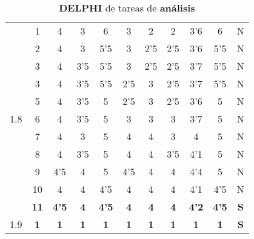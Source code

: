 \documentclass[11pt,a4paper,spanish,twoside]{report}
\begin{document}
\begin{table}[!h]
\begin{tabular}{|c|c||c|c|c|c|c||c|c|c||c|}
    \multirow{11}{*}{1.8} 
    & 1  & 4   & 3   & 6   & 3   & 2   & 2   & 3'6 & 6   & N \\
    & 2  & 4   & 3   & 5'5 & 3   & 2'5 & 2'5 & 3'6 & 5'5 & N \\
    & 3  & 4   & 3'5 & 5'5 & 3   & 2'5 & 2'5 & 3'7 & 5'5 & N \\
    & 3  & 4   & 3'5 & 5'5 & 2'5 & 3   & 2'5 & 3'7 & 5'5 & N \\
    & 5  & 4   & 3'5 & 5   & 2'5 & 3   & 2'5 & 3'6 & 5   & N \\
    & 6  & 4   & 3'5 & 5   & 3   & 3   & 3   & 3'7 & 5   & N \\
    & 7  & 4   & 3   & 5   & 4   & 4   & 3   & 4   & 5   & N \\
    & 8  & 4   & 3'5 & 5   & 4   & 4   & 3'5 & 4'1 & 5   & N \\
    & 9  & 4'5 & 4   & 5   & 4'5 & 4   & 4   & 4'4 & 5   & N \\
    & 10 & 4   & 4   & 4'5 & 4   & 4   & 4   & 4'1 & 4'5 & N \\
    & \textbf{11} & \textbf{4'5} & \textbf{4} & \textbf{4'5} & \textbf{4} &
    \textbf{4} & \textbf{4} & \textbf{4'2} & \textbf{4'5} & \textbf{S} \\ 
    \hline

    1.9 & \textbf{1} & \textbf{1} & \textbf{1} & \textbf{1} &
    \textbf{1} & \textbf{1} & \textbf{1} & \textbf{1} & \textbf{1} &
    \textbf{S} \\
    \hline
  \end{tabular}
  \caption{\textbf{DELPHI} de tareas de \textbf{análisis}} 
  \label{Tab:DELPHIana}
\end{table}
\end{document}
